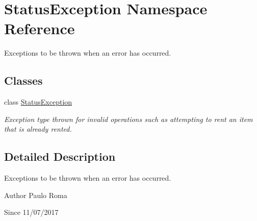 \hypertarget{namespaceStatusException}{}\section{Status\+Exception Namespace Reference}
\label{namespaceStatusException}


Exceptions to be thrown when an error has occurred.  


\subsection*{Classes}
\begin{DoxyCompactItemize}
\item 
class \hyperlink{classStatusException_1_1StatusException}{Status\+Exception}
\begin{DoxyCompactList}\small\item\em Exception type thrown for invalid operations such as attempting to rent an item that is already rented. \end{DoxyCompactList}\end{DoxyCompactItemize}


\subsection{Detailed Description}
Exceptions to be thrown when an error has occurred. 

\begin{DoxyAuthor}{Author}
Paulo Roma 
\end{DoxyAuthor}
\begin{DoxySince}{Since}
11/07/2017 
\end{DoxySince}
